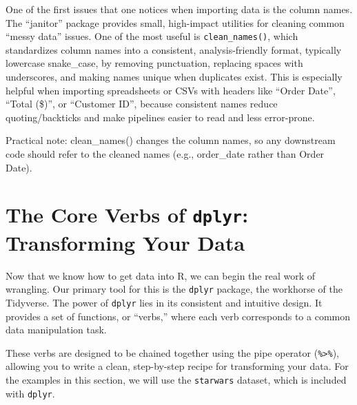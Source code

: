 \documentclass[
  11pt,
]{article}
\newenvironment{Shaded}{\begin{snugshade}}{\end{snugshade}}
\newcommand{\CommentTok}[1]{\textcolor[rgb]{0.56,0.35,0.01}{\textit{#1}}}
\newcommand{\FunctionTok}[1]{\textcolor[rgb]{0.13,0.29,0.53}{\textbf{#1}}}
\newcommand{\NormalTok}[1]{#1}
\newcommand{\OtherTok}[1]{\textcolor[rgb]{0.56,0.35,0.01}{#1}}
\newcommand{\SpecialCharTok}[1]{\textcolor[rgb]{0.81,0.36,0.00}{\textbf{#1}}}
\begin{document}
One of the first issues that one notices when importing data is the
column names. The ``janitor'' package provides small, high-impact
utilities for cleaning common ``messy data'' issues. One of the most
useful is \texttt{clean\_names()}, which standardizes column names into
a consistent, analysis-friendly format, typically lowercase snake\_case,
by removing punctuation, replacing spaces with underscores, and making
names unique when duplicates exist. This is especially helpful when
importing spreadsheets or CSVs with headers like ``Order Date'', ``Total
(\$)'', or ``Customer ID'', because consistent names reduce
quoting/backticks and make pipelines easier to read and less
error-prone.

\begin{Shaded}
\end{Shaded}

Practical note: clean\_names() changes the column names, so any
downstream code should refer to the cleaned names (e.g., order\_date
rather than Order Date).

\section{\texorpdfstring{The Core Verbs of \texttt{dplyr}: Transforming
Your
Data}{The Core Verbs of dplyr: Transforming Your Data}}\label{the-core-verbs-of-dplyr-transforming-your-data}

Now that we know how to get data into R, we can begin the real work of
wrangling. Our primary tool for this is the \texttt{dplyr} package, the
workhorse of the Tidyverse. The power of \texttt{dplyr} lies in its
consistent and intuitive design. It provides a set of functions, or
``verbs,'' where each verb corresponds to a common data manipulation
task.

These verbs are designed to be chained together using the pipe operator
(\texttt{\%\textgreater{}\%}), allowing you to write a clean,
step-by-step recipe for transforming your data. For the examples in this
section, we will use the \texttt{starwars} dataset, which is included
with \texttt{dplyr}.
\end{document}
